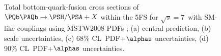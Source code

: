 \begin{figure}[htb]
\caption{\label{YRHXS_MSSM_neutral_fig4} Total bottom-quark-fusion
cross sections of $\PQb\PAQb\to \PSH/\PSA+X$ within the 5FS for $\sqrt{s}=7$\UTeV\ with SM-like couplings using MSTW2008 PDFs
\cite{Martin:2009iq,Martin:2009bu}; (a) central prediction, (b) scale
uncertainties, (c) 68\% CL~PDF+$\alphas$ uncertainties, (d) 90\%
CL~PDF+$\alphas$ uncertainties.}
\end{figure}

